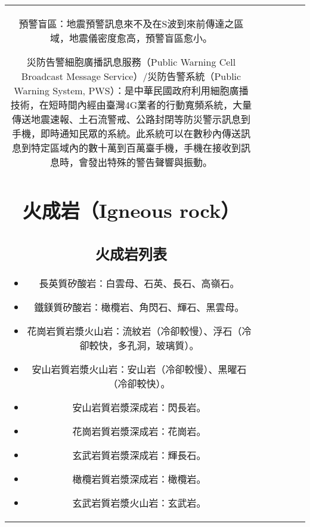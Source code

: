 \documentclass[a4paper,12pt]{report}
\begin{document}
\begin{tabular}{|c|c|c|c|c|c|}
預警盲區：地震預警訊息來不及在S波到來前傳達之區域，地震儀密度愈高，預警盲區愈小。

災防告警細胞廣播訊息服務（Public Warning Cell Broadcast Message Service）/災防告警系統（Public Warning System, PWS）：是中華民國政府利用細胞廣播技術，在短時間內經由臺灣4G業者的行動寬頻系統，大量傳送地震速報、土石流警戒、公路封閉等防災警示訊息到手機，即時通知民眾的系統。此系統可以在數秒內傳送訊息到特定區域內的數十萬到百萬臺手機，手機在接收到訊息時，會發出特殊的警告聲響與振動。
\section{火成岩（Igneous rock）}
\subsection{火成岩列表}
\begin{itemize}
\item 長英質矽酸岩：白雲母、石英、長石、高嶺石。
\item 鐵鎂質矽酸岩：橄欖岩、角閃石、輝石、黑雲母。
\item 花崗岩質岩漿火山岩：流紋岩（冷卻較慢）、浮石（冷卻較快，多孔洞，玻璃質）。
\item 安山岩質岩漿火山岩：安山岩（冷卻較慢）、黑曜石（冷卻較快）。
\item 安山岩質岩漿深成岩：閃長岩。
\item 花崗岩質岩漿深成岩：花崗岩。
\item 玄武岩質岩漿深成岩：輝長石。
\item 橄欖岩質岩漿深成岩：橄欖岩。
\item 玄武岩質岩漿火山岩：玄武岩。
\end{itemize}

\end{tabular}
\end{document}
